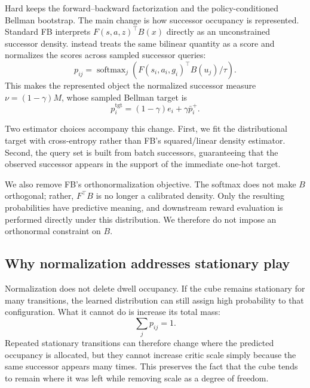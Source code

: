 Hard \DensityFB{} keeps the forward--backward factorization and the policy-conditioned Bellman bootstrap.
The main change is how successor occupancy is represented.
Standard FB interprets $F(s,a,z)^\top B(x)$ directly as an unconstrained successor density.
\DensityFB{} instead treats the same bilinear quantity as a score and normalizes the scores across sampled successor queries:
\begin{equation}
    p_{ij} = \operatorname{softmax}_j \left( F(s_i,a_i,g_i)^\top B(u_j)/\tau \right).
\end{equation}
This makes the represented object the normalized successor measure $\nu=(1-\gamma)M$, whose sampled Bellman target is 
\begin{equation}
p_i^{\mathrm{tgt}} = (1-\gamma)e_i+\gamma\bar p_i^+.
\end{equation}

Two estimator choices accompany this change.
First, we fit the distributional target with cross-entropy rather than FB's squared/linear density estimator.
Second, the query set is built from batch successors, guaranteeing that the observed successor appears in the support of the immediate one-hot target.

We also remove FB's orthonormalization objective.
The softmax does not make $B$ orthogonal; rather, $F^\top B$ is no longer a calibrated density.
Only the resulting probabilities have predictive meaning, and downstream reward evaluation is performed directly under this distribution.
We therefore do not impose an orthonormal constraint on $B$.

\subsection{Why normalization addresses stationary play}

Normalization does not delete dwell occupancy.
If the cube remains stationary for many transitions, the learned distribution can still assign high probability to that configuration.
What it cannot do is increase its total mass:
\begin{equation}
    \sum_j p_{ij}=1.
\end{equation}
Repeated stationary transitions can therefore change where the predicted occupancy is allocated, but they cannot increase critic scale simply because the same successor appears many times.
This preserves the fact that the cube tends to remain where it was left while removing scale as a degree of freedom.

